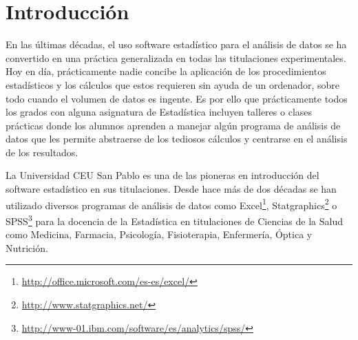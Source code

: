 \documentclass[a4paper,10pt,twoside]{article}
\newcommand{\rkteaching}{\textsf{rk.Teaching}}
\newcommand{\spss}{\textsf{SPSS}}
\newcommand{\statgraphics}{\textsf{Statgraphics}}
\begin{document}
\begin{abstract}
En los últimos años el departamento de Matemática Aplicada y Estadística de la Universidad CEU San Pablo ha hecho una
apuesta decidida por el uso del software libre, y en particular de R, en la docencia de Estadística. 
Para ello se ha desarrollado el paquete \rkteaching{} con el objeto de superar las limitaciones de las interfaces
gráficas de usuario de R existentes hasta la fecha y liberar a los alumnos de la necesidad de aprender a programar R. 

En este artículo se presentan las principales características del paquete \rkteaching{} y se valora uso docente en las
clases prácticas de Estadística tanto presenciales como no presenciales.

\newline
\noindent\textbf{Palabras Clave:} Estadística, Análisis de Datos, Docencia, R, \rkteaching.
\newline
\begin{center}
 \textbf{Abstract}
\end{center}

\vspace{1.2mm}A translation of the abstract in english.\\
\newline
\noindent\textbf{Keywords:} Statistics, Data Analysis, Teaching, R, \rkteaching.

\end{abstract}

\section{Introducción}
\label{s:introduccion}
En las últimas décadas, el uso software estadístico para el análisis de datos se ha convertido en una práctica
generalizada en todas las titulaciones experimentales.
Hoy en día, prácticamente nadie concibe la aplicación de los procedimientos estadísticos y los cálculos que estos
requieren sin ayuda de un ordenador, sobre todo cuando el volumen de datos es ingente.
Es por ello que prácticamente todos los grados con alguna asignatura de Estadística incluyen talleres o clases prácticas
donde los alumnos aprenden a manejar algún programa de análisis de datos que les permite abstraerse de los tediosos
cálculos y centrarse en el análisis de los resultados.

La Universidad CEU San Pablo es una de las pioneras en introducción del software estadístico en sus titulaciones. 
Desde hace más de dos décadas se han utilizado diversos programas de análisis de datos como
Excel\footnote{\url{http://office.microsoft.com/es-es/excel/}},
\statgraphics{}\footnote{\url{http://www.statgraphics.net/}} o
\spss{}\footnote{\url{http://www-01.ibm.com/software/es/analytics/spss/}} para la docencia de la Estadística en
titulaciones de Ciencias de la Salud como Medicina, Farmacia, Psicología, Fisioterapia, Enfermería, Óptica y Nutrición.
\end{document}
